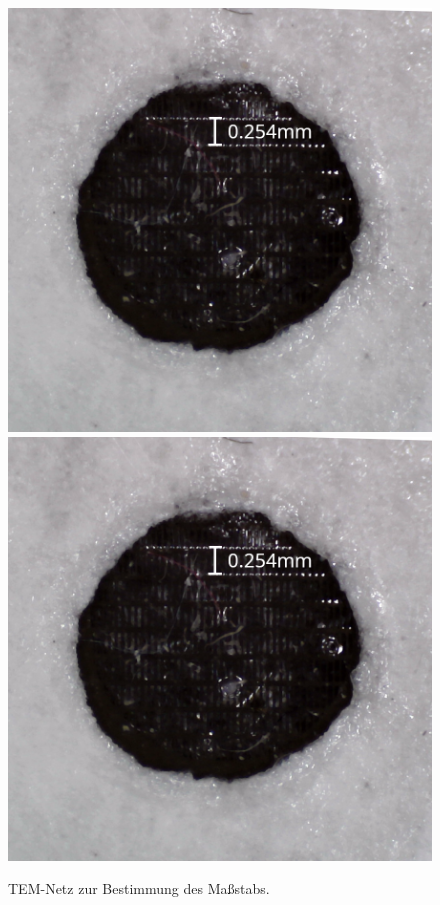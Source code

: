 \documentclass{article}
\begin{document}
\begin{figure}[h]
\begin{minipage}{0.49\textwidth}
        \caption{STM-Spitze, die zur Vermessung der HOPG-Probe verwendet wurde.
        Der Maßstab ergibt sich aus der Dicke des Drahts, welche \SI{0.3}{\mm} beträgt.
        Die Spitze wurde für diese Messung neu gerissen.}
        \label{fig:spitze-2}
    \end{minipage}
    \hfill
    \begin{minipage}{0.49\textwidth}
        \centering
        \includegraphics[width=\textwidth]{GitterHOPG}
        \includegraphics[width=\textwidth]{GitterHOPG}
        \caption{TEM-Netz zur Bestimmung des Maßstabs.}
        \label{fig:gitter-hopg}
    \end{minipage}
\end{figure}
\end{document}
